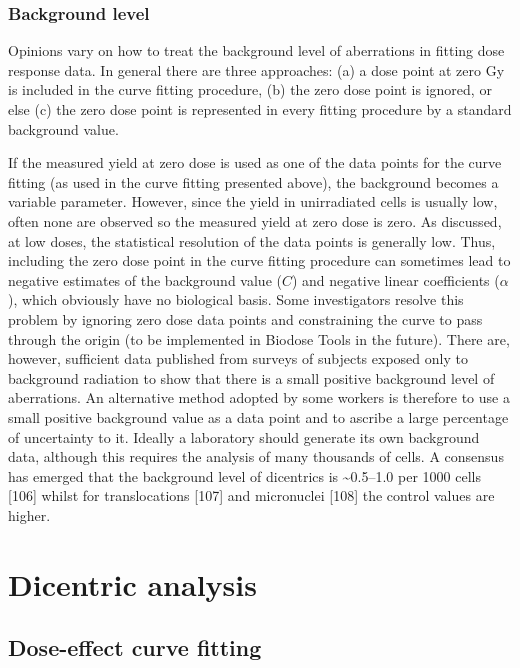 \documentclass[]{scrartcl}
\begin{document}
\hypertarget{background-level}{%
\subsubsection{Background level}\label{background-level}}

Opinions vary on how to treat the background level of aberrations in fitting dose response data. In general there are three approaches: (a) a dose point at zero Gy is included in the curve fitting procedure, (b) the zero dose point is ignored, or else (c) the zero dose point is represented in every fitting procedure by a standard background value.

If the measured yield at zero dose is used as one of the data points for the curve fitting (as used in the curve fitting presented above), the background becomes a variable parameter. However, since the yield in unirradiated cells is usually low, often none are observed so the measured yield at zero dose is zero. As discussed, at low doses, the statistical resolution of the data points is generally low. Thus, including the zero dose point in the curve fitting procedure can sometimes lead to negative estimates of the background value (\(C\)) and negative linear coefficients (\(\alpha\)), which obviously have no biological basis. Some investigators resolve this problem by ignoring zero dose data points and constraining the curve to pass through the origin (to be implemented in Biodose Tools in the future). There are, however, sufficient data published from surveys of subjects exposed only to background radiation to show that there is a small positive background level of aberrations. An alternative method adopted by some workers is therefore to use a small positive background value as a data point and to ascribe a large percentage of uncertainty to it. Ideally a laboratory should generate its own background data, although this requires the analysis of many thousands of cells. A consensus has emerged that the background level of dicentrics is \textasciitilde0.5--1.0 per 1000 cells {[}106{]} whilst for translocations {[}107{]} and micronuclei {[}108{]} the control values are higher.

\hypertarget{stats-dicent}{%
\section{Dicentric analysis}\label{stats-dicent}}

\hypertarget{dose-effect-curve-fitting-1}{%
\subsection{Dose-effect curve fitting}\label{dose-effect-curve-fitting-1}}
\end{document}
